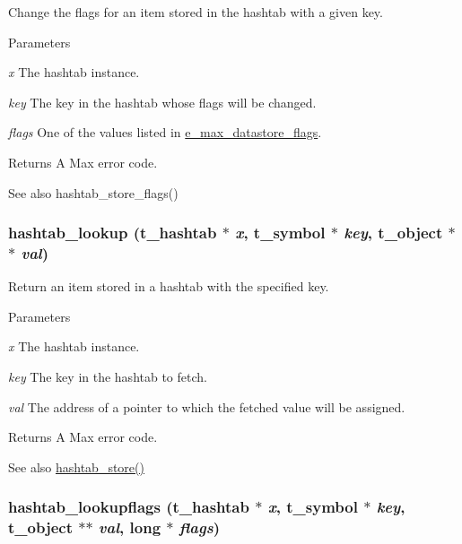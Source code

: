 Change the flags for an item stored in the hashtab with a given key. 
\begin{DoxyParams}{Parameters}
\item[{\em x}]The hashtab instance. \item[{\em key}]The key in the hashtab whose flags will be changed. \item[{\em flags}]One of the values listed in \hyperlink{group__datastore_gaa858d4b3815076d79624c39d9ca59348}{e\_\-max\_\-datastore\_\-flags}. \end{DoxyParams}
\begin{DoxyReturn}{Returns}
A Max error code. 
\end{DoxyReturn}
\begin{DoxySeeAlso}{See also}
hashtab\_\-store\_\-flags() 
\end{DoxySeeAlso}
\hypertarget{group__hashtab_gadb206ea811204926bdbf1aa00ca679dc}{
\subsubsection[{hashtab\_\-lookup}]{ hashtab\_\-lookup ({\bf t\_\-hashtab} $\ast$ {\em x}, \/  {\bf t\_\-symbol} $\ast$ {\em key}, \/  {\bf t\_\-object} $\ast$$\ast$ {\em val})}}
\label{group__hashtab_gadb206ea811204926bdbf1aa00ca679dc}


Return an item stored in a hashtab with the specified key. 
\begin{DoxyParams}{Parameters}
\item[{\em x}]The hashtab instance. \item[{\em key}]The key in the hashtab to fetch. \item[{\em val}]The address of a pointer to which the fetched value will be assigned.\end{DoxyParams}
\begin{DoxyReturn}{Returns}
A Max error code. 
\end{DoxyReturn}
\begin{DoxySeeAlso}{See also}
\hyperlink{group__hashtab_gaa26ebe9ba21e84dd0dbb8d5aed12e5a1}{hashtab\_\-store()} 
\end{DoxySeeAlso}
\hypertarget{group__hashtab_ga0947b6e2b1e6ed6b55b7f891536429b9}{
\subsubsection[{hashtab\_\-lookupflags}]{ hashtab\_\-lookupflags ({\bf t\_\-hashtab} $\ast$ {\em x}, \/  {\bf t\_\-symbol} $\ast$ {\em key}, \/  {\bf t\_\-object} $\ast$$\ast$ {\em val}, \/  long $\ast$ {\em flags})}}
\label{group__hashtab_ga0947b6e2b1e6ed6b55b7f891536429b9}


